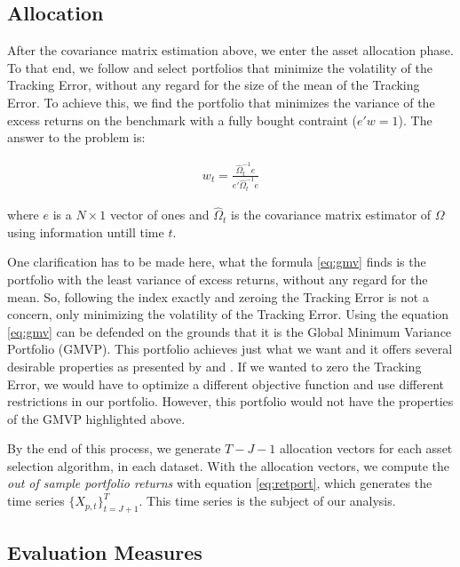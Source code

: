 \documentclass[12pt,oneside,a4paper]{memoir}
\begin{document}
\subsection{Allocation}
After the covariance matrix estimation above, we enter the asset allocation phase.
To that end, we follow  and select portfolios that minimize the volatility of the Tracking Error, without any regard for the size of the mean of the Tracking Error.
To achieve this, we find the portfolio that minimizes the variance of the excess returns on the benchmark with a fully bought contraint ($e'w=1$).
The answer to the problem is:


\vspace{-18 pt}
\begin{align} \label{eq:gmv}
w_{t} = \frac{\hat{\Omega}_{t}^{-1}e}{e'\hat{\Omega}_{t}^{-1}e}
\end{align}

\noindent
where $e$ is a $N \times 1$ vector of ones and $\hat{\Omega}_{t}$ is the covariance matrix estimator of $\Omega$ using information untill time $t$.

One clarification has to be made here, what the formula \eqref{eq:gmv} finds is the portfolio with the least variance of excess returns, without any regard for the mean.
So, following the index exactly and zeroing the Tracking Error is not a concern, only minimizing the volatility of the Tracking Error.
Using the equation \eqref{eq:gmv} can be defended on the grounds that it is the Global Minimum Variance Portfolio (GMVP).
This portfolio achieves just what we want and it offers several desirable properties as presented by  and .
If we wanted to zero the Tracking Error, we would have to optimize a different objective function and use different restrictions in our portfolio.
However, this portfolio would not have the properties of the GMVP highlighted above.

By the end of this process, we generate $T-J-1$ allocation vectors for each asset selection algorithm, in each dataset.
With the allocation vectors, we compute the \textit{out of sample portfolio returns} with equation \eqref{eq:retport}, which generates the time series $\{X_{p,t}\}_{t=J+1}^{T}$.
This time series is the subject of our analysis. 

\subsection{Evaluation Measures} %
\end{document}
